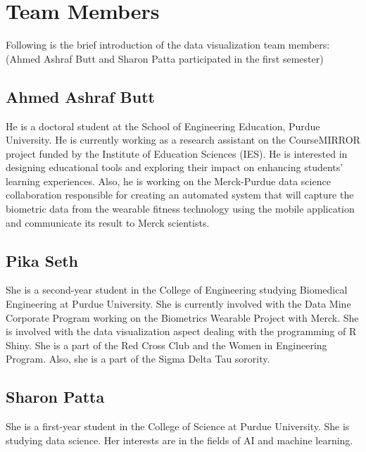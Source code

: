 \documentclass[]{book}
\begin{document}
\hypertarget{team-members}{%
\section{Team Members}\label{team-members}}

Following is the brief introduction of the data visualization team members:
(Ahmed Ashraf Butt and Sharon Patta participated in the first semester)

\hypertarget{ahmed-ashraf-butt}{%
\subsection{Ahmed Ashraf Butt}\label{ahmed-ashraf-butt}}

He is a doctoral student at the School of Engineering Education, Purdue University. He is currently working as a research assistant on the CourseMIRROR project funded by the Institute of Education Sciences (IES). He is interested in designing educational tools and exploring their impact on enhancing students' learning experiences. Also, he is working on the Merck-Purdue data science collaboration responsible for creating an automated system that will capture the biometric data from the wearable fitness technology using the mobile application and communicate its result to Merck scientists.

\hypertarget{pika-seth}{%
\subsection{Pika Seth}\label{pika-seth}}

She is a second-year student in the College of Engineering studying Biomedical Engineering at Purdue University. She is currently involved with the Data Mine Corporate Program working on the Biometrics Wearable Project with Merck. She is involved with the data visualization aspect dealing with the programming of R Shiny. She is a part of the Red Cross Club and the Women in Engineering Program. Also, she is a part of the Sigma Delta Tau sorority.

\hypertarget{sharon-patta}{%
\subsection{Sharon Patta}\label{sharon-patta}}

She is a first-year student in the College of Science at Purdue University. She is studying data science. Her interests are in the fields of AI and machine learning.
\end{document}
